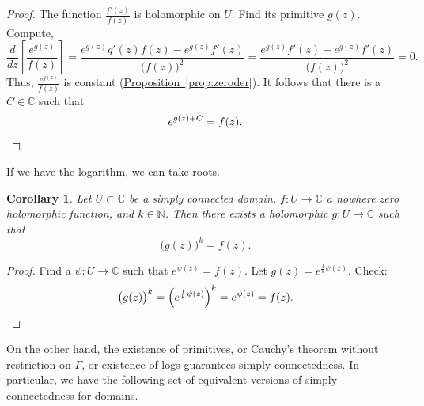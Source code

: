 \documentclass[12pt,openany]{book}
\newcommand{\C}{{\mathbb{C}}}
\newcommand{\N}{{\mathbb{N}}}
\theoremstyle{plain}
\newtheorem{cor}[thm]{Corollary}
\theoremstyle{remark}
\theoremstyle{definition}
\theoremstyle{exercise}
\theoremstyle{example}
\newcommand{\propref}[1]{\hyperref[#1]{Proposition~\ref*{#1}}}
\begin{document}
\begin{proof}
The function $\frac{f'(z)}{f(z)}$ is holomorphic on $U$.
Find its primitive $g(z)$.  Compute,
\begin{equation*}
\frac{d}{dz} \left[ \frac{e^{g(z)}}{f(z)} \right] =
\frac{ e^{g(z)} g'(z) f(z) - e^{g(z)} f'(z) }{{\bigl(f(z)\bigr)}^2}
=
\frac{ e^{g(z)} f'(z) - e^{g(z)} f'(z) }{{\bigl(f(z)\bigr)}^2}
=
0 .
\end{equation*}
Thus, $\frac{e^{g(z)}}{f(z)}$ is constant
(\propref{prop:zeroder}).  It follows that
there is a $C \in \C$ such that
\begin{equation*}
e^{g(z) + C} = f(z) .
\qedhere
\end{equation*}
\end{proof}

If we have the logarithm, we can take roots.

\begin{cor}
Let $U \subset \C$ be a simply connected domain,
$f \colon U \to \C$ a nowhere zero holomorphic
function, and $k \in \N$.
Then there exists a holomorphic $g \colon U \to \C$
such that
\begin{equation*}
{\bigl(g(z)\bigr)}^k = f(z) .
\end{equation*}
\end{cor}

\begin{proof}
Find a $\psi \colon U \to \C$ such that $e^{\psi(z)} = f(z)$.  Let
$g(z) = e^{\frac{1}{k} \psi(z)}$.  Check:
\begin{equation*}
{\bigl(g(z)\bigr)}^k
=
{\left( e^{\frac{1}{k} \psi(z)} \right)}^k
=
e^{\psi(z)} = f(z) . \qedhere
\end{equation*}
\end{proof}

On the other hand, the existence of primitives, or
Cauchy's theorem without restriction on $\Gamma$, or existence of logs guarantees
simply-connectedness.  In particular, we have the following set of equivalent
versions of simply-connectedness for domains.
\end{document}
